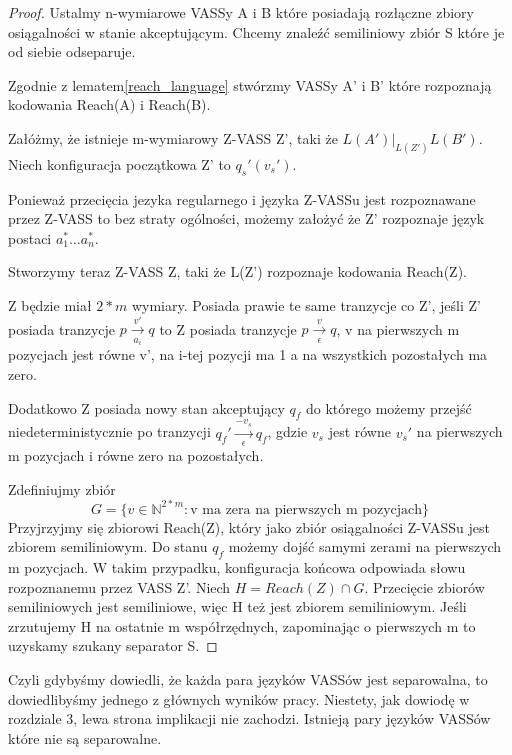     \begin{proof}
        Ustalmy n-wymiarowe VASSy A i B które posiadają rozłączne zbiory osiągalności w stanie akceptującym.
        Chcemy znaleźć semiliniowy zbiór S które je od siebie odseparuje.

        Zgodnie z lematem\ref{reach_language} stwórzmy VASSy A' i B' które rozpoznają kodowania Reach(A) i Reach(B).

        Załóżmy, że istnieje m-wymiarowy Z-VASS Z', taki że $L(A') |_{L(Z')} L(B')$.
        Niech  konfiguracja początkowa Z' to $q_s '(v_s ')$.

        Ponieważ przecięcia jezyka regularnego i języka Z-VASSu jest rozpoznawane przez Z-VASS to bez straty ogólności,
        możemy założyć że Z' rozpoznaje język postaci $a_1^* \dots a_n^*$.

        Stworzymy teraz Z-VASS Z, taki że L(Z') rozpoznaje kodowania Reach(Z).

        Z będzie miał $2*m$ wymiary.
        Posiada prawie te same tranzycje co Z', jeśli Z' posiada tranzycje  $p \xrightarrow[a_i]{v'} q$ to Z posiada tranzycje
        $p \xrightarrow[\epsilon]{v} q$, v na pierwszych m pozycjach jest równe v', na i-tej pozycji ma 1 a na wszystkich pozostałych ma zero.

        Dodatkowo Z posiada nowy stan akceptujący $q_f$ do którego możemy przejść niedeterministycznie po tranzycji $q_f' \xrightarrow[\epsilon]{-v_s} q_f$,
        gdzie $v_s$ jest równe $v_s'$ na pierwszych m pozycjach i równe zero na pozostałych.

        Zdefiniujmy zbiór
        \[G=\{v \in \mathbb{N}^{2*m} : \text{v ma zera na pierwszych m pozycjach} \}\]
        Przyjrzyjmy się zbiorowi Reach(Z), który jako zbiór osiągalności Z-VASSu jest zbiorem semiliniowym\cite{toolbox}.
        Do stanu $q_f$ możemy dojść samymi zerami na pierwszych m pozycjach.
        W takim przypadku, konfiguracja końcowa odpowiada słowu rozpoznanemu  przez VASS Z'.
        Niech $H=Reach(Z) \cap G$.
        Przecięcie zbiorów semiliniowych jest semiliniowe, więc H też jest zbiorem semiliniowym.
        Jeśli zrzutujemy H na ostatnie m współrzędnych, zapominając o pierwszych m to uzyskamy szukany separator S.

    \end{proof}
    Czyli gdybyśmy dowiedli, że każda para języków VASSów jest separowalna, to dowiedlibyśmy jednego z głównych wyników pracy\cite{reach_sep_jerome}.
    Niestety, jak dowiodę w rozdziale 3, lewa strona implikacji nie zachodzi.
    Istnieją pary języków VASSów które nie są separowalne.




